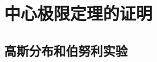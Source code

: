 \documentclass[master]{thesis-uestc}
\begin{document}
\chapter{中心极限定理的证明}

\section{高斯分布和伯努利实验}





% 

% 
% 



\end{document}
